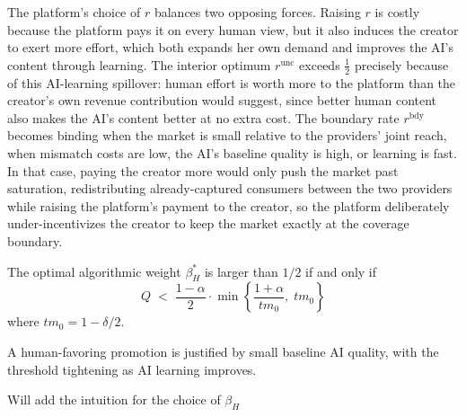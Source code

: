 The platform's choice of $r$ balances two opposing forces. Raising $r$ 
is costly because the platform pays it on every human view, but it 
also induces the creator to exert more effort, which both expands her 
own demand and improves the AI's content through 
learning. The interior optimum $r^{\text{unc}}$ exceeds 
$\tfrac{1}{2}$ precisely because of this AI-learning spillover: human 
effort is worth more to the platform than the creator's own revenue 
contribution would suggest, since better human content also makes the 
AI's content better at no extra cost. The boundary rate 
$r^{\text{bdy}}$ becomes binding when the market is small 
relative to the providers' joint reach, when mismatch costs are low, 
the AI's baseline quality is high, or learning is fast. In that case, 
paying the creator more would only push the market past saturation, 
redistributing already-captured consumers between the two providers 
while raising the platform's payment to the creator, so the platform deliberately 
under-incentivizes the creator to keep the market exactly at the 
coverage boundary.



\begin{corollary}
\label{cor:beta_0.5:View-Based}
    The optimal algorithmic weight $\beta_H^*$ is larger than $1/2$ if and only if 
    \[
    Q \;<\; \frac{1-\alpha}{2}\cdot\min\!\left\{\frac{1+\alpha}{tm_0},\; tm_0\right\}
    \]
where $tm_0 = 1-\delta/2$.
\end{corollary}

A human-favoring promotion is justified by {small} baseline AI
quality, with the threshold tightening as AI learning improves.

{\color{red} Will add the intuition for the choice of $\beta_H$}

